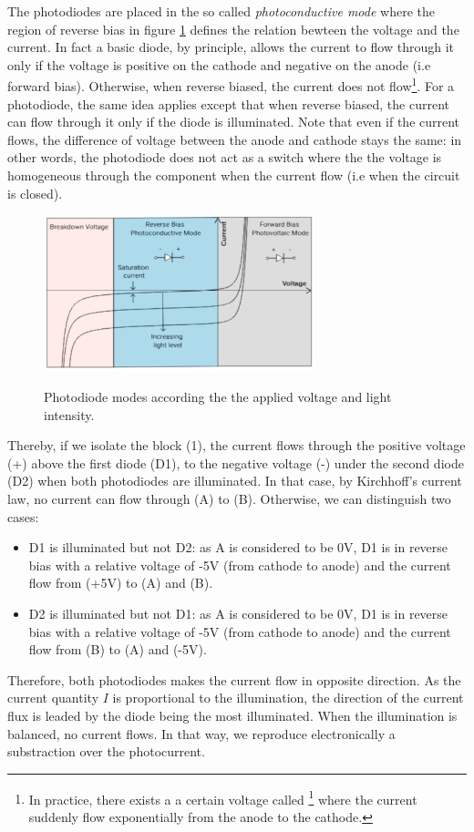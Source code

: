 \documentclass[10pt]{report}
\begin{document}
The photodiodes are placed in the so called \textit{photoconductive mode} where the region of reverse bias in figure \ref{fig:photodiode-vi} defines the relation bewteen the voltage and the current. In fact a basic diode, by principle, allows the current to flow through it only if the voltage is positive on the cathode and negative on the anode (i.e forward bias). Otherwise, when reverse biased, the current does not flow\footnote{In practice, there exists a a certain voltage called \footnote{breakdown voltage} where the current suddenly flow exponentially from the anode to the cathode.}. For a photodiode, the same idea applies except that when reverse biased, the current can flow through it only if the diode is illuminated. Note that even if the current flows, the difference of voltage between the anode and cathode stays the same: in other words, the photodiode does not act as a switch where the the voltage is homogeneous through the component when the current flow (i.e when the circuit is closed). 

\begin{figure}[h!]
\caption{Photodiode modes according the the applied voltage and light intensity.}
\centering
\includegraphics[width=0.7\textwidth]{photodiode-vi}
\label{fig:photodiode-vi}
\end{figure}

Thereby, if we isolate the block (1), the current flows through the positive voltage (+) above the first diode (D1), to the negative voltage (-) under the second diode (D2) when both photodiodes are illuminated. In that case, by Kirchhoff's current law, no current can flow through (A) to (B). Otherwise, we can distinguish two cases:
\begin{itemize}
 \item D1 is illuminated but not D2: as A is considered to be 0V, D1 is in reverse bias with a relative voltage of -5V (from cathode to anode) and the current flow from (+5V) to (A) and (B).
 \item D2 is illuminated but not D1: as A is considered to be 0V, D1 is in reverse bias with a relative voltage of -5V (from cathode to anode) and the current flow from (B) to (A) and (-5V).
\end{itemize}
Therefore, both photodiodes makes the current flow in opposite direction. As the current quantity $I$ is proportional to the illumination, the direction of the current flux is leaded by the diode being the most illuminated. When the illumination is balanced, no current flows. In that way, we reproduce electronically a substraction over the photocurrent.
\end{document}
